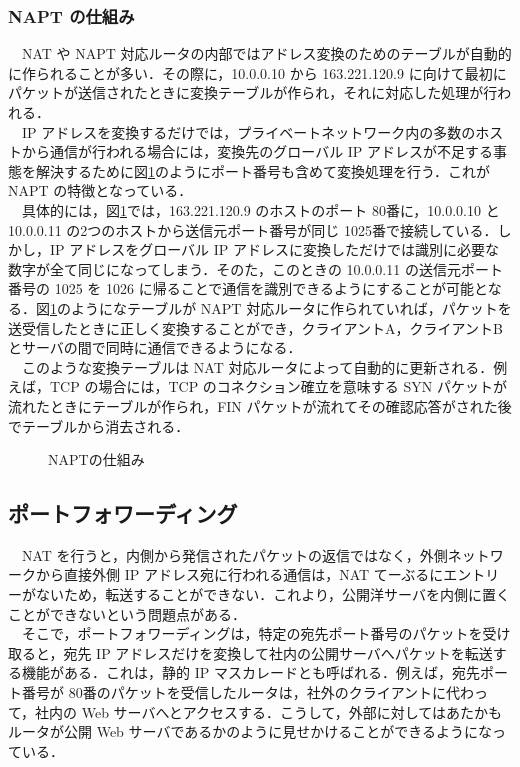 \documentclass[a4j,titlepage]{jarticle}
\begin{document}
\begin{itemize}
\subsubsection{NAPT の仕組み}
　NAT や NAPT 対応ルータの内部ではアドレス変換のためのテーブルが自動的に作られることが多い．その際に，10.0.0.10 から 163.221.120.9 に向けて最初にパケットが送信されたときに変換テーブルが作られ，それに対応した処理が行われる．\\
　IP アドレスを変換するだけでは，プライベートネットワーク内の多数のホストから通信が行われる場合には，変換先のグローバル IP アドレスが不足する事態を解決するために図\ref{fig:napt}のようにポート番号も含めて変換処理を行う．これが NAPT の特徴となっている．\\
　具体的には，図\ref{fig:napt}では，163.221.120.9 のホストのポート 80番に，10.0.0.10 と 10.0.0.11 の2つのホストから送信元ポート番号が同じ 1025番で接続している．しかし，IP アドレスをグローバル IP アドレスに変換しただけでは識別に必要な数字が全て同じになってしまう．そのた，このときの 10.0.0.11 の送信元ポート番号の 1025 を 1026 に帰ることで通信を識別できるようにすることが可能となる．図\ref{fig:napt}のようになテーブルが NAPT 対応ルータに作られていれば，パケットを送受信したときに正しく変換することができ，クライアントA，クライアントB とサーバの間で同時に通信できるようになる．\\
　このような変換テーブルは NAT 対応ルータによって自動的に更新される．例えば，TCP の場合には，TCP のコネクション確立を意味する SYN パケットが流れたときにテーブルが作られ，FIN パケットが流れてその確認応答がされた後でテーブルから消去される\cite{bib:iptext}．


  \begin{figure}[htbp]
    \begin{center}
      \caption{NAPTの仕組み}
     \label{fig:napt}
   \end{center}
  \end{figure}


\subsection{ポートフォワーディング}
　NAT を行うと，内側から発信されたパケットの返信ではなく，外側ネットワークから直接外側 IP アドレス宛に行われる通信は，NAT てーぶるにエントリーがないため，転送することができない．これより，公開洋サーバを内側に置くことができないという問題点がある．\\
　そこで，ポートフォワーディングは，特定の宛先ポート番号のパケットを受け取ると，宛先 IP アドレスだけを変換して社内の公開サーバへパケットを転送する機能がある．これは，静的 IP マスカレードとも呼ばれる．例えば，宛先ポート番号が 80番のパケットを受信したルータは，社外のクライアントに代わって，社内の Web サーバへとアクセスする．こうして，外部に対してはあたかもルータが公開 Web サーバであるかのように見せかけることができるようになっている．


\end{itemize}
\end{document}
